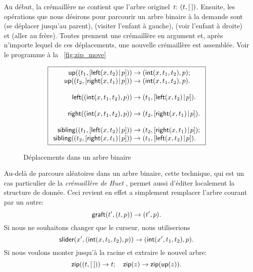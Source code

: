 Au début, la crémaillère ne contient que l'arbre originel~\(t\):
\(({t},{[\,]})\). Ensuite, les opérations que nous désirons pour
parcourir un arbre binaire à la demande sont
 (se déplacer jusqu'au parent),
 (visiter l'enfant à gauche),
 (voir l'enfant à droite) et
 (aller au frère).
Toutes prennent une crémaillère en argument et, après n'importe lequel
de ces déplacements, une nouvelle crémaillère est assemblée. Voir le programme à la
\fig~\vref{fig:zip_move}
\begin{figure}
\begin{equation*}
\boxed{
\begin{array}{r@{\;}c@{\;}l}
\fun{up}(\pair{t_1}{\cons{\fun{left}(x,t_2)}{p}}) & \rightarrow &
  \pair{\fun{int}(x,t_1,t_2)}{p};\\
\fun{up}(\pair{t_2}{\cons{\fun{right}(x,t_1)}{p}}) & \rightarrow &
\pair{\fun{int}(x,t_1,t_2)}{p}.\\
\\
\fun{left}(\pair{\fun{int}(x,t_1,t_2)}{p}) & \rightarrow &
  \pair{t_1}{\cons{\fun{left}(x,t_2)}{p}}.\\
\\
\fun{right}(\pair{\fun{int}(x,t_1,t_2)}{p}) & \rightarrow &
  \pair{t_2}{\cons{\fun{right}(x,t_1)}{p}}.\\
\\
\fun{sibling}(\pair{t_1}{\cons{\fun{left}(x,t_2)}{p}}) & \rightarrow &
  \pair{t_2}{\cons{\fun{right}(x,t_1)}{p}};\\
\fun{sibling}(\pair{t_2}{\cons{\fun{right}(x,t_1)}{p}}) & \rightarrow&
  \pair{t_1}{\cons{\fun{left}(x,t_2)}{p}}.
\end{array}}
\end{equation*}
\caption{Déplacements dans un arbre binaire\label{fig:zip_move}}
\end{figure}

Au-delà de parcours aléatoires dans un arbre binaire, cette technique,
qui est un cas particulier de la \emph{crémaillère de Huet}
\citep{Huet_1997}, permet aussi d'éditer localement la structure de
donnée.  Ceci revient en effet a simplement remplacer l'arbre courant
par un autre:
\begin{equation*}
\textsf{graft}(t',({t},{p})) \rightarrow ({t'},{p}).
\end{equation*}
Si nous ne souhaitons changer que le curseur, nous utiliserions
\begin{equation*}
\textsf{slider}(x',({\textsf{int}(x,t_1,t_2)},{p})) \rightarrow
({\textsf{int}(x',t_1,t_2)},{p}).
\end{equation*}
Si nous voulons monter jusqu'à la racine et extraire le nouvel arbre:
\begin{equation*}
\textsf{zip}(({t},{[\,]})) \rightarrow t;\quad
\textsf{zip}(z) \rightarrow \textsf{zip}(\textsf{up}(z)).
\end{equation*}

